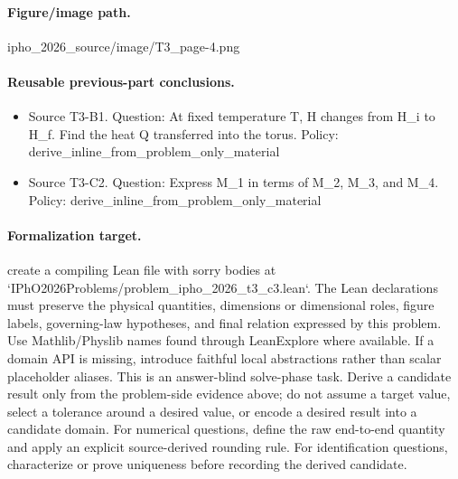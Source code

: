 \paragraph{Figure/image path.}
ipho\_2026\_source/image/T3\_page-4.png

\paragraph{Reusable previous-part conclusions.}
\begin{itemize}
\item Source T3-B1. Question: At fixed temperature T, H changes from H\_i to H\_f. Find the heat Q transferred into the torus. Policy: derive\_inline\_from\_problem\_only\_material
\item Source T3-C2. Question: Express M\_1 in terms of M\_2, M\_3, and M\_4. Policy: derive\_inline\_from\_problem\_only\_material
\end{itemize}

\paragraph{Formalization target.}
create a compiling Lean file with sorry bodies at `IPhO2026Problems/problem\_ipho\_2026\_t3\_c3.lean`.
The Lean declarations must preserve the physical quantities, dimensions or dimensional roles, figure labels, governing-law hypotheses, and final relation expressed by this problem.
Use Mathlib/Physlib names found through LeanExplore where available. If a domain API is missing, introduce faithful local abstractions rather than scalar placeholder aliases.
This is an answer-blind solve-phase task. Derive a candidate result only from the problem-side evidence above; do not assume a target value, select a tolerance around a desired value, or encode a desired result into a candidate domain.
For numerical questions, define the raw end-to-end quantity and apply an explicit source-derived rounding rule. For identification questions, characterize or prove uniqueness before recording the derived candidate.

